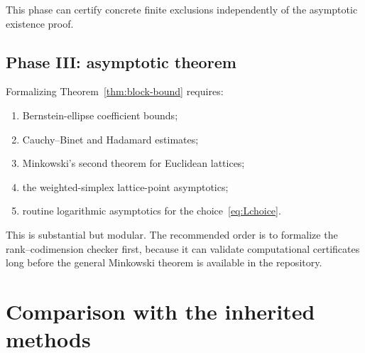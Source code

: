 \documentclass[11pt,oneside]{article}
\theoremstyle{definition}
\theoremstyle{remark}
\begin{document}
This phase can certify concrete finite exclusions independently of the asymptotic existence
proof.

\subsection{Phase III: asymptotic theorem}

Formalizing Theorem~\ref{thm:block-bound} requires:

\begin{enumerate}
\item Bernstein-ellipse coefficient bounds;
\item Cauchy--Binet and Hadamard estimates;
\item Minkowski's second theorem for Euclidean lattices;
\item the weighted-simplex lattice-point asymptotics;
\item routine logarithmic asymptotics for the choice~\eqref{eq:Lchoice}.
\end{enumerate}

This is substantial but modular.  The recommended order is to formalize the rank--codimension
checker first, because it can validate computational certificates long before the general
Minkowski theorem is available in the repository.

\section{Comparison with the inherited methods}
\label{sec:comparison}
\end{document}
